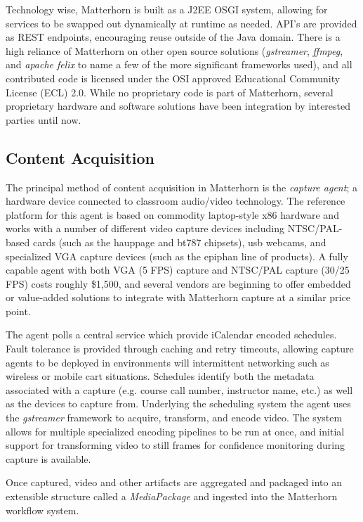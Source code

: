 \documentclass{sig-alternate}
\begin{document}
Technology wise, Matterhorn is built as a J2EE OSGI system, allowing for services to be swapped out dynamically at runtime as needed.  API's are provided as REST endpoints, encouraging reuse outside of the Java domain.  There is a high reliance of Matterhorn on other open source solutions (\emph{gstreamer}, \emph{ffmpeg}, and \emph{apache felix} to name a few of the more significant frameworks used), and all contributed code is licensed under the OSI approved Educational Community License (ECL) 2.0.  While no proprietary code is part of Matterhorn, several proprietary hardware and software solutions have been integration by interested parties until now.

\subsection{Content Acquisition}
The principal method of content acquisition in Matterhorn is the \emph{capture agent}; a hardware device connected to classroom audio/video technology.  The reference platform for this agent is based on commodity laptop-style x86 hardware and works with a number of different video capture devices including NTSC/PAL-based cards (such as the hauppage and bt787 chipsets), usb webcams, and specialized VGA capture devices (such as the epiphan line of products).  A fully capable agent with both VGA (5 FPS) capture and NTSC/PAL capture (30/25 FPS) costs roughly \$1,500, and several vendors are beginning to offer embedded or value-added solutions to integrate with Matterhorn capture at a similar price point.

The agent polls a central service which provide iCalendar encoded schedules.  Fault tolerance is provided through caching and retry timeouts, allowing capture agents to be deployed in environments will intermittent networking such as wireless or mobile cart situations.  Schedules identify both the metadata associated with a capture (e.g. course call number, instructor name, etc.) as well as the devices to capture from.  Underlying the scheduling system the agent uses the \emph{gstreamer} framework to acquire, transform, and encode video.  The system allows for multiple specialized encoding pipelines to be run at once, and initial support for transforming video to still frames for confidence monitoring during capture is available.

Once captured, video and other artifacts are aggregated and packaged into an extensible structure called a \emph{MediaPackage} and ingested into the Matterhorn workflow system.
\end{document}
